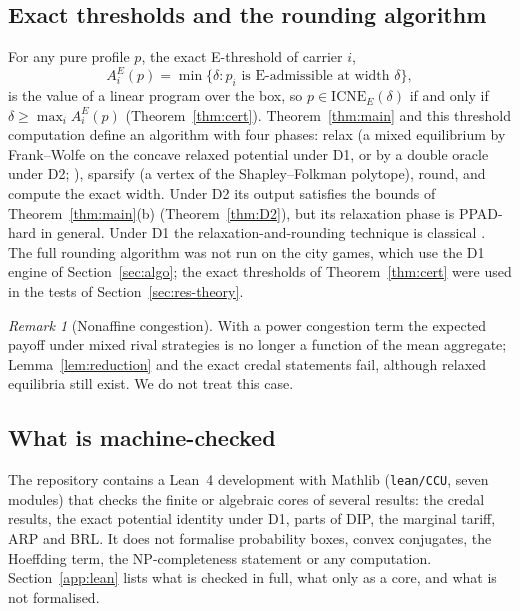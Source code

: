 \documentclass[preprint,11pt]{elsarticle}
\theoremstyle{definition}
\theoremstyle{remark}
\newtheorem{remark}[theorem]{Remark}
\newcommand{\ICNE}{\mathrm{ICNE}}
\begin{document}
\subsection{Exact thresholds and the rounding algorithm}\label{sec:cert}

For any pure profile $p$, the exact E-threshold of carrier $i$,\[A^E_i(p)=\min\{\delta: p_i\text{ is E-admissible at width }\delta\},\]is the value of a linear program over the box, so $p\in\ICNE_E(\delta)$ if and only if $\delta\ge\max_iA^E_i(p)$ (Theorem~\ref{thm:cert}). Theorem~\ref{thm:main} and this threshold computation define an algorithm with four phases: relax (a mixed equilibrium by Frank--Wolfe on the concave relaxed potential under D1, or by a double oracle under D2; \citealp{McMahan2003}), sparsify (a vertex of the Shapley--Folkman polytope), round, and compute the exact width. Under D2 its output satisfies the bounds of Theorem~\ref{thm:main}(b) (Theorem~\ref{thm:D2}), but its relaxation phase is PPAD-hard in general. Under D1 the relaxation-and-rounding technique is classical \citep{Aubin1976,Udell2016,Bonnans2023}. The full rounding algorithm was not run on the city games, which use the D1 engine of Section~\ref{sec:algo}; the exact thresholds of Theorem~\ref{thm:cert} were used in the tests of Section~\ref{sec:res-theory}.

\begin{remark}[Nonaffine congestion]\label{rem:nonaffine}
With a power congestion term the expected payoff under mixed rival strategies is no longer a function of the mean aggregate; Lemma~\ref{lem:reduction} and the exact credal statements fail, although relaxed equilibria still exist. We do not treat this case.
\end{remark}

\subsection{What is machine-checked}\label{sec:lean}

The repository contains a Lean~4 development with Mathlib (\texttt{lean/CCU}, seven modules) that checks the finite or algebraic cores of several results: the credal results, the exact potential identity under D1, parts of DIP, the marginal tariff, ARP and BRL. It does not formalise probability boxes, convex conjugates, the Hoeffding term, the NP-completeness statement or any computation. Section~\ref{app:lean} lists what is checked in full, what only as a core, and what is not formalised.
\end{document}
